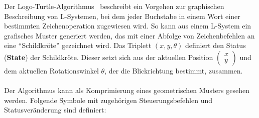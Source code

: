 Der Logo-Turtle-Algorithmus~\cite{prusinkiewicz_1986} beschreibt ein Vorgehen zur graphischen Beschreibung von L-Systemen, bei dem
jeder Buchstabe in einem Wort einer bestimmten Zeichenoperation zugewiesen wird.
So kann aus einem L-System ein grafisches Muster generiert werden, das mit einer Abfolge von Zeichenbefehlen an
eine "`Schildkröte"' gezeichnet wird.
Das Triplett $(x,y,\theta)$ definiert den Status (\textbf{State}) der Schildkröte.
Dieser setzt sich aus der aktuellen Position $\left(\begin{smallmatrix} x \\ y \end{smallmatrix}\right)$ und dem
aktuellen Rotationswinkel $\theta$, der die Blickrichtung bestimmt, zusammen.\\~\\
Der Algorithmus kann als Komprimierung eines geometrischen Musters gesehen werden.
Folgende Symbole mit zugehörigen Steuerungsbefehlen und Statusveränderung sind definiert:

